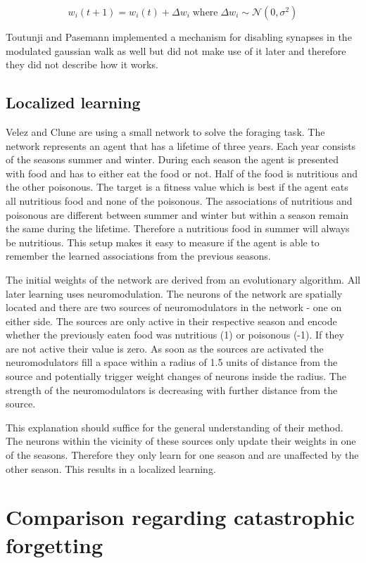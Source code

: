 \documentclass[12pt,twoside]{scrartcl}
\theoremstyle{plain}
\theoremstyle{definition}
\theoremstyle{remark}
\begin{document}
\[
    w_i (t + 1) = w_i (t) + \Delta w_i \;\text{where}\; \Delta w_i \sim \mathcal{N}(0, \sigma^2)
\]

Toutunji and Pasemann implemented a mechanism for disabling synapses
in the modulated gaussian walk as well but did not make use of it later and
therefore they did not describe how it works.

\subsection{Localized learning}
\label{subsec:diffusion}

Velez and Clune are using a small network to solve the foraging task. The network
represents an agent that has a lifetime of three years. Each year consists of
the seasons summer and winter. During each season the agent is presented with
food and has to either eat the food or not. Half of the food is nutritious
and the other poisonous. The target is a fitness value which is best if the
agent eats all nutritious food and none of the poisonous. The associations of
nutritious and poisonous are different between summer and winter but within
a season remain the same during the lifetime. Therefore a nutritious food in
summer will always be nutritious.
This setup makes it easy to measure if the agent is able to remember the learned
associations from the previous seasons.

The initial weights of the network are derived from an evolutionary algorithm.
All later learning uses neuromodulation. The neurons of the network are spatially
located and there are two sources of neuromodulators in the network - one on either
side. The sources are only active in their respective season and encode whether
the previously eaten food was nutritious (1) or poisonous (-1). If they are
not active their value is zero. As soon as the sources are activated the neuromodulators
fill a space within a radius of 1.5 units of distance from the source and potentially
trigger weight changes of neurons inside the radius. The strength of the neuromodulators
is decreasing with further distance from the source.

This explanation should suffice for the general understanding of their method.
The neurons within the vicinity of these sources only update their weights
in one of the seasons. Therefore they only learn for one season and are unaffected
by the other season. This results in a localized learning.

\section{Comparison regarding catastrophic forgetting}
\label{sec:comparison}
\end{document}
